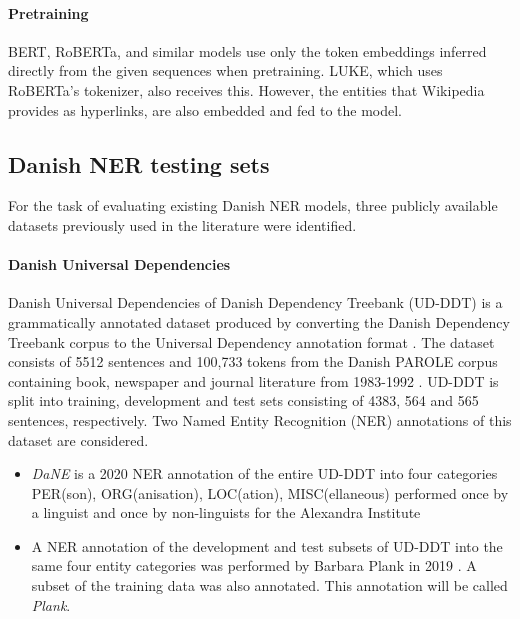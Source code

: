 \documentclass[main.tex]{subfiles}
\begin{document}
\paragraph{Pretraining}
BERT, RoBERTa, and similar models use only the token embeddings inferred directly from the given sequences when pretraining.
LUKE, which uses RoBERTa's tokenizer, also receives this.
However, the entities that Wikipedia provides as hyperlinks, are also embedded and fed to the model.


\subsection{Danish NER testing sets}
\label{subsec:daNERdata}
For the task of evaluating existing Danish NER models, three publicly available datasets previously used in the literature were identified.

\paragraph{Danish Universal Dependencies}
Danish Universal Dependencies of Danish Dependency Treebank (UD-DDT) is a grammatically annotated dataset produced by converting the Danish Dependency Treebank corpus \cite{kromann2003ddt} to the Universal Dependency annotation format \cite{johann2015udddt}.
The dataset consists of 5512 sentences and 100,733 tokens from the Danish PAROLE corpus containing book, newspaper and journal literature from 1983-1992 \cite{christensen1998parole}.
UD-DDT is split into training, development and test sets consisting of 4383, 564 and 565 sentences, respectively.
Two Named Entity Recognition (NER) annotations of this dataset are considered.
\begin{itemize}
    \item \emph{DaNE} is a 2020 NER annotation of the entire UD-DDT into four categories PER(son), ORG(anisation), LOC(ation), MISC(ellaneous) performed once by a linguist and once by non-linguists for the Alexandra Institute \cite[Sec. 4]{hvingelby2020dane}
    \item A NER annotation of the development and test subsets of UD-DDT into the same four entity categories was performed by Barbara Plank in 2019 \cite{plank2019neural}.
    A subset of the training data was also annotated.
    This annotation will be called \emph{Plank}.
\end{itemize}
\end{document}
